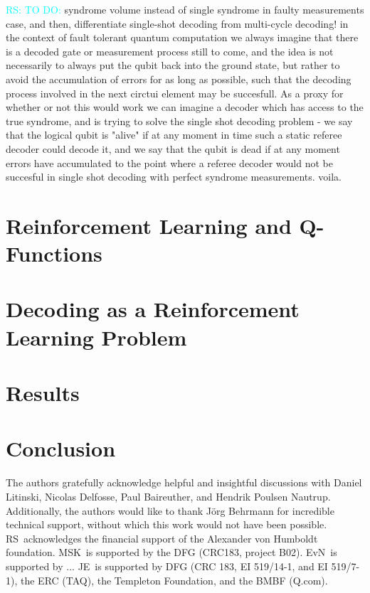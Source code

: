 \documentclass[onecolumn,preprintnumbers,amsmath,amssymb,notitlepage,nofootinbib,longbibliography,superscriptaddress,aps,pra,10pt]{revtex4-1}
\newcommand{\ryan}[1]{\textcolor{Cyan}{RS: #1}}
\begin{document}
    \ryan{TO DO:} syndrome volume instead of single syndrome in faulty measurements case, and then, differentiate single-shot decoding from multi-cycle decoding! in the context of fault tolerant quantum computation we always imagine that there is a decoded gate or measurement process still to come, and the idea is not necessarily to always put the qubit back into the ground state, but rather to avoid the accumulation of errors for as long as possible, such that the decoding process involved in the next circtui element may be succesfull. As a proxy for whether or not this would work we can imagine a decoder which has access to the true syndrome, and is trying to solve the single shot decoding problem - we say that the logical qubit is "alive" if at any moment in time such a static referee decoder could decode it, and we say that the qubit is dead if at any moment errors have accumulated to the point where a referee decoder would not be succesful in single shot decoding with perfect syndrome measurements. voila.

   

\section{Reinforcement Learning and Q-Functions}\label{s:reinforcement_learning}
\section{Decoding as a Reinforcement Learning Problem}\label{s:decoding_as_rl}
\section{Results}\label{s:results}
\section{Conclusion}\label{s:conclusions}


\begin{acknowledgments}
	The authors gratefully acknowledge helpful and insightful discussions with Daniel Litinski, Nicolas Delfosse, Paul Baireuther, and Hendrik Poulsen Nautrup.
	Additionally, the authors would like to thank J\"{o}rg Behrmann for incredible technical support, without which this work would not have been possible.
	RS\ acknowledges the financial support of the Alexander von Humboldt foundation.
	MSK\ is supported by the DFG (CRC183, project B02).
	EvN\ is supported by ...
	JE\ is supported by DFG (CRC 183, EI 519/14-1, and EI 519/7-1), the ERC (TAQ), the Templeton Foundation, and the BMBF (Q.com).
\end{acknowledgments}


\end{document}
